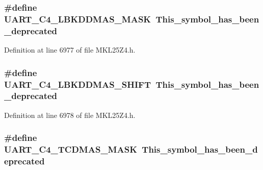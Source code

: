 \subsubsection[{\texorpdfstring{U\+A\+R\+T\+\_\+\+C4\+\_\+\+L\+B\+K\+D\+D\+M\+A\+S\+\_\+\+M\+A\+SK}{UART_C4_LBKDDMAS_MASK}}]{\setlength{\rightskip}{0pt plus 5cm}\#define U\+A\+R\+T\+\_\+\+C4\+\_\+\+L\+B\+K\+D\+D\+M\+A\+S\+\_\+\+M\+A\+SK~This\+\_\+symbol\+\_\+has\+\_\+been\+\_\+deprecated}\hypertarget{group___backward___compatibility___symbols_ga4fbe0c821c729ee10ec2a5398d68e13f}{}\label{group___backward___compatibility___symbols_ga4fbe0c821c729ee10ec2a5398d68e13f}


Definition at line 6977 of file M\+K\+L25\+Z4.\+h.

\subsubsection[{\texorpdfstring{U\+A\+R\+T\+\_\+\+C4\+\_\+\+L\+B\+K\+D\+D\+M\+A\+S\+\_\+\+S\+H\+I\+FT}{UART_C4_LBKDDMAS_SHIFT}}]{\setlength{\rightskip}{0pt plus 5cm}\#define U\+A\+R\+T\+\_\+\+C4\+\_\+\+L\+B\+K\+D\+D\+M\+A\+S\+\_\+\+S\+H\+I\+FT~This\+\_\+symbol\+\_\+has\+\_\+been\+\_\+deprecated}\hypertarget{group___backward___compatibility___symbols_gaa3e4b00c90d731ac214ec241c5739824}{}\label{group___backward___compatibility___symbols_gaa3e4b00c90d731ac214ec241c5739824}


Definition at line 6978 of file M\+K\+L25\+Z4.\+h.

\subsubsection[{\texorpdfstring{U\+A\+R\+T\+\_\+\+C4\+\_\+\+T\+C\+D\+M\+A\+S\+\_\+\+M\+A\+SK}{UART_C4_TCDMAS_MASK}}]{\setlength{\rightskip}{0pt plus 5cm}\#define U\+A\+R\+T\+\_\+\+C4\+\_\+\+T\+C\+D\+M\+A\+S\+\_\+\+M\+A\+SK~This\+\_\+symbol\+\_\+has\+\_\+been\+\_\+deprecated}\hypertarget{group___backward___compatibility___symbols_ga9a5b6a456c330e9d6b15e612c6e5725a}{}\label{group___backward___compatibility___symbols_ga9a5b6a456c330e9d6b15e612c6e5725a}


